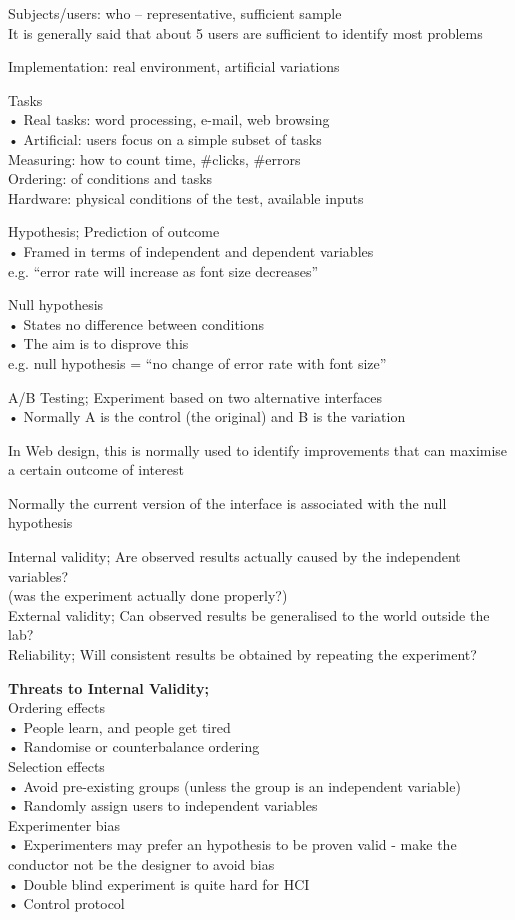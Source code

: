 \documentclass[]{project_plan}
\begin{document}
Subjects/users: who – representative, sufficient sample\\
It is generally said that about 5 users are sufficient to identify most problems

Implementation: real environment, artificial variations

Tasks\\
• Real tasks: word processing, e-mail, web browsing\\
• Artificial: users focus on a simple subset of tasks\\
Measuring: how to count time, \#clicks, \#errors\\
Ordering: of conditions and tasks\\
Hardware: physical conditions of the test, available inputs

Hypothesis; Prediction of outcome\\
• Framed in terms of independent and dependent variables\\
e.g. “error rate will increase as font size decreases”

Null hypothesis\\
• States no difference between conditions\\
• The aim is to disprove this\\
e.g. null hypothesis = “no change of error rate with font size”

A/B Testing; Experiment based on two alternative interfaces\\
• Normally A is the control (the original) and B is the variation

In Web design, this is normally used to identify improvements that can maximise a
certain outcome of interest

Normally the current version of the interface is associated with the null hypothesis

Internal validity; Are observed results actually caused by the independent variables?\\
(was the experiment actually done properly?)\\
External validity; Can observed results be generalised to the world outside the lab?\\
Reliability;  Will consistent results be obtained by repeating the experiment?

\textbf{Threats to Internal Validity;}\\
Ordering effects\\
• People learn, and people get tired\\
• Randomise or counterbalance ordering\\
Selection effects\\
• Avoid pre-existing groups (unless the group is an independent variable)\\
• Randomly assign users to independent variables\\
Experimenter bias\\
• Experimenters may prefer an hypothesis to be proven valid - make the conductor not be the designer to avoid bias\\
• Double blind experiment is quite hard for HCI\\
• Control protocol
\end{document}
